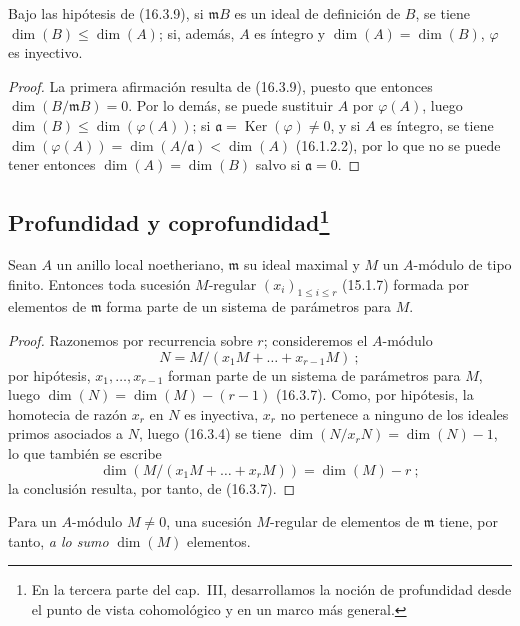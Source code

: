 \begin{corollary}[16.3.10]
\label{0.16.3.10-fr}
Bajo las hipótesis de (16.3.9), si $\mathfrak{m}B$ es un ideal de definición
de $B$, se tiene $\dim(B)\leq\dim(A)$; si, además, $A$ es íntegro y
$\dim(A)=\dim(B)$, $\varphi$ es inyectivo.
\end{corollary}

\begin{proof}
La primera afirmación resulta de (16.3.9), puesto que entonces
$\dim(B/\mathfrak{m}B)=0$. Por lo demás, se puede sustituir $A$ por
$\varphi(A)$, luego $\dim(B)\leq\dim(\varphi(A))$; si
$\mathfrak{a}=\operatorname{Ker}(\varphi)\neq0$, y si $A$ es íntegro, se tiene
$\dim(\varphi(A))=\dim(A/\mathfrak{a})<\dim(A)$ (16.1.2.2), por lo que no se
puede tener entonces $\dim(A)=\dim(B)$ salvo si $\mathfrak{a}=0$.
\end{proof}

\subsection[Profundidad y coprofundidad]{Profundidad y
coprofundidad\protect\footnote{En la tercera parte del cap.~III, desarrollamos
la noción de profundidad desde el punto de vista cohomológico y en un marco
más general.}}
\label{subsection:0.16.4-fr}

\begin{proposition}[16.4.1]
\label{0.16.4.1-fr}
Sean $A$ un anillo local noetheriano, $\mathfrak{m}$ su ideal maximal y $M$ un
$A$-módulo de tipo finito. Entonces toda sucesión $M$-regular
$(x_i)_{1\leq i\leq r}$ (15.1.7) formada por elementos de $\mathfrak{m}$ forma
parte de un sistema de parámetros para $M$.
\end{proposition}

\begin{proof}
Razonemos por recurrencia sobre $r$; consideremos el $A$-módulo
\[
  N=M/(x_1M+\ldots+x_{r-1}M)~;
\]
por hipótesis, $x_1,\ldots,x_{r-1}$ forman parte de un sistema de parámetros
para $M$, luego $\dim(N)=\dim(M)-(r-1)$ (16.3.7). Como, por hipótesis, la
homotecia de razón $x_r$ en $N$ es inyectiva, $x_r$ no pertenece a ninguno de
los ideales primos asociados a $N$, luego (16.3.4) se tiene
$\dim(N/x_rN)=\dim(N)-1$, lo que también se escribe
\[
  \dim(M/(x_1M+\ldots+x_rM))=\dim(M)-r~;
\]
la conclusión resulta, por tanto, de (16.3.7).
\end{proof}

Para un $A$-módulo $M\neq0$, una sucesión $M$-regular de elementos de
$\mathfrak{m}$ tiene, por tanto, \emph{a lo sumo} $\dim(M)$ elementos.

